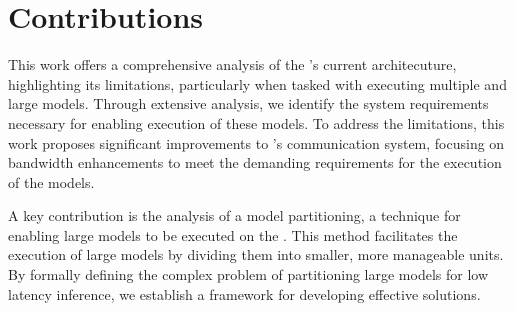 \section{Contributions}


This work offers a comprehensive analysis of the \graicore{}'s current architecuture, highlighting its limitations, particularly when tasked with executing multiple and large models.
Through extensive analysis, we identify the system requirements necessary for enabling execution of these models.
To address the limitations, this work proposes significant improvements to \graicore{}'s communication system, focusing on bandwidth enhancements to meet the demanding requirements for the execution of the models.

A key contribution is the analysis of a model partitioning, a technique for enabling large models to be executed on the \graicore{}.
This method facilitates the execution of large models by dividing them into smaller, more manageable units.
By formally defining the complex problem of partitioning large models for low latency inference, we establish a framework for developing effective solutions.

